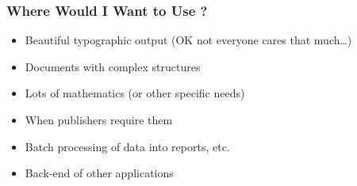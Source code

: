 \begin{frame}
\begin{itemize}
\begin{columns}[T]
\begin{column}{.48\linewidth}
\end{column}
\begin{column}{.48\linewidth}
%
\end{column}
\end{columns}

\end{itemize}
\end{frame}

\begin{frame}
\frametitle{Where Would I Want to Use ?}
\begin{itemize}
\item Beautiful typographic output \pause(OK not everyone cares that much\ldots)
\item Documents with complex structures
\item Lots of mathematics \pause(or other specific needs)\pause
\item When publishers \alert{require} them
\item Batch processing of data into reports, etc.
\pause
\item Back-end of other applications
\end{itemize}
\end{frame}

